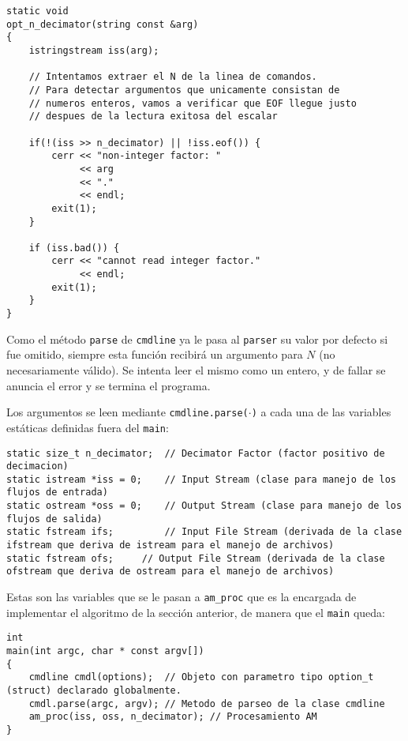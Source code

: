 \lstset{language=C++} %
\begin{lstlisting}[frame=single]
static void
opt_n_decimator(string const &arg)
{
	istringstream iss(arg);

	// Intentamos extraer el N de la linea de comandos.
	// Para detectar argumentos que unicamente consistan de
	// numeros enteros, vamos a verificar que EOF llegue justo
	// despues de la lectura exitosa del escalar
	
	if(!(iss >> n_decimator) || !iss.eof()) {
		cerr << "non-integer factor: "
		     << arg
		     << "."
		     << endl;
		exit(1);
	}

	if (iss.bad()) {
		cerr << "cannot read integer factor."
		     << endl;
		exit(1);
	}
}
\end{lstlisting}

Como el método \texttt{parse} de \texttt{cmdline} ya le pasa al \texttt{parser} su valor por defecto si fue omitido, siempre esta función recibirá un argumento para $N$ (no necesariamente válido). Se intenta leer el mismo como un entero, y de fallar se anuncia el error y se termina el programa. 

Los argumentos se leen mediante \texttt{cmdline.parse($\cdot$)} a cada una de las variables estáticas definidas fuera del \texttt{main}:

 
\lstset{language=C++}
\begin{lstlisting}[frame=single]
static size_t n_decimator;	// Decimator Factor (factor positivo de decimacion)
static istream *iss = 0;	// Input Stream (clase para manejo de los flujos de entrada)
static ostream *oss = 0;	// Output Stream (clase para manejo de los flujos de salida)
static fstream ifs; 		// Input File Stream (derivada de la clase ifstream que deriva de istream para el manejo de archivos)
static fstream ofs;		// Output File Stream (derivada de la clase ofstream que deriva de ostream para el manejo de archivos)
\end{lstlisting}

Estas son las variables que se le pasan a \texttt{am\_proc} que es la encargada de implementar el algoritmo de la sección anterior, de manera que el \texttt{main} queda:


\lstset{language=C++}
\begin{lstlisting}[frame=single]
int
main(int argc, char * const argv[])
{
	cmdline cmdl(options);	// Objeto con parametro tipo option_t (struct) declarado globalmente.
	cmdl.parse(argc, argv);	// Metodo de parseo de la clase cmdline
	am_proc(iss, oss, n_decimator);	// Procesamiento AM
}
\end{lstlisting}

